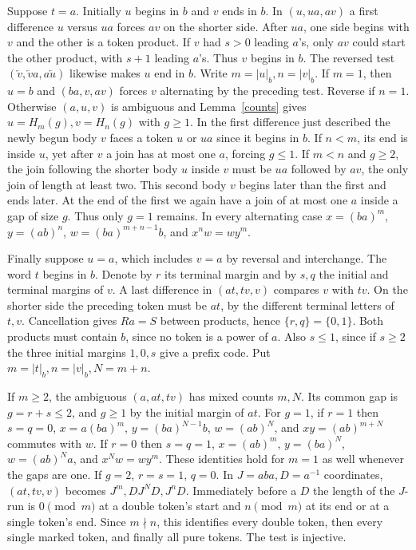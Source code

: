 \documentclass[11pt,a4paper]{article}
\newcommand{\rev}[1]{\overleftarrow{#1}}
\newcommand{\bct}[1]{\lvert #1\rvert_b}
\begin{document}
Suppose $t=a$. Initially $u$ begins in $b$ and $v$ ends in $b$. In $(u,ua,av)$ a first difference $u$ versus $ua$ forces $av$ on the shorter side. After $ua$, one side begins with $v$ and the other is a token product. If $v$ had $s>0$ leading $a$'s, only $av$ could start the other product, with $s+1$ leading $a$'s. Thus $v$ begins in $b$. The reversed test $(\rev v,\rev v a,a\rev u)$ likewise makes $u$ end in $b$.
Write $m=\bct u,n=\bct v$. If $m=1$, then $u=b$ and $(ba,v,av)$ forces $v$ alternating by the preceding test. Reverse if $n=1$. Otherwise $(a,u,v)$ is ambiguous and Lemma~\ref{counts} gives $u=H_m(g),v=H_n(g)$ with $g\ge1$. In the first difference just described the newly begun body $v$ faces a token $u$ or $ua$ since it begins in $b$. If $n<m$, its end is inside $u$, yet after $v$ a join has at most one $a$, forcing $g\le1$. If $m<n$ and $g\ge2$, the join following the shorter body $u$ inside $v$ must be $ua$ followed by $av$, the only join of length at least two. This second body $v$ begins later than the first and ends later. At the end of the first we again have a join of at most one $a$ inside a gap of size $g$. Thus only $g=1$ remains. In every alternating case $x=(ba)^m$, $y=(ab)^n$, $w=(ba)^{m+n-1}b$, and $x^n w=w y^m$.

Finally suppose $u=a$, which includes $v=a$ by reversal and interchange. The word $t$ begins in $b$. Denote by $r$ its terminal margin and by $s,q$ the initial and terminal margins of $v$. A last difference in $(at,tv,v)$ compares $v$ with $tv$. On the shorter side the preceding token must be $at$, by the different terminal letters of $t,v$. Cancellation gives $R a=S$ between products, hence $\{r,q\}=\{0,1\}$. Both products must contain $b$, since no token is a power of $a$. Also $s\le1$, since if $s\ge2$ the three initial margins $1,0,s$ give a prefix code. Put $m=\bct t,n=\bct v,N=m+n$.

If $m\ge2$, the ambiguous $(a,at,tv)$ has mixed counts $m,N$. Its common gap is $g=r+s\le2$, and $g\ge1$ by the initial margin of $at$. For $g=1$, if $r=1$ then $s=q=0$, $x=a(ba)^m$, $y=(ba)^{N-1}b$, $w=(ab)^N$, and $xy=(ab)^{m+N}$ commutes with $w$. If $r=0$ then $s=q=1$, $x=(ab)^m$, $y=(ba)^N$, $w=(ab)^N a$, and $x^N w=w y^m$. These identities hold for $m=1$ as well whenever the gaps are one. If $g=2$, $r=s=1$, $q=0$. In $J=aba,D=a^{-1}$ coordinates, $(at,tv,v)$ becomes $J^m,DJ^{N}D,J^nD$. Immediately before a $D$ the length of the $J$-run is $0\pmod m$ at a double token's start and $n\pmod m$ at its end or at a single token's end. Since $m\nmid n$, this identifies every double token, then every single marked token, and finally all pure tokens. The test is injective.
\end{document}
